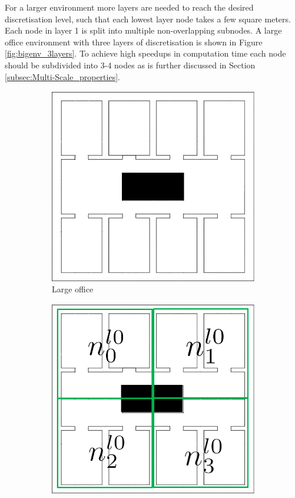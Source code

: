 For a larger environment more layers are needed to reach the desired discretisation level, such that each lowest layer node takes a few square meters. Each node in layer 1 is split into multiple non-overlapping subnodes. A large office environment with three layers of discretisation is shown in Figure \ref{fig:bigenv_3layers}. To achieve high speedups in computation time each node should be subdivided into 3-4 nodes as is further discussed in Section \ref{subsec:Multi-Scale_properties}.
\begin{figure}
    \centering
    \begin{subfigure}[b]{0.23\textwidth}
        \includegraphics[width=\textwidth]{Report/images/Bilda.png}
        \caption[t]{Large office}
        \label{subfig:bigenv}
    \end{subfigure}
    \hfill
    \begin{subfigure}[b]{0.23\textwidth}
        \includegraphics[width=\textwidth]{Report/images/Bildb_c.png}

\end{subfigure}
\end{figure}
